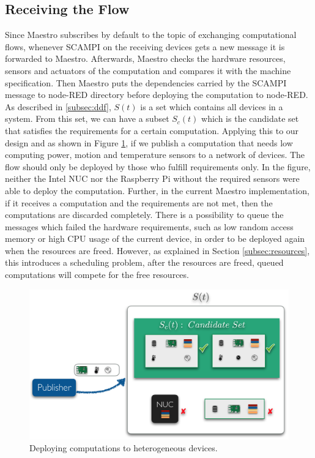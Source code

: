 \subsection{Receiving the Flow}
Since Maestro subscribes  by default  to the topic of exchanging computational flows, whenever SCAMPI on the receiving devices gets a new message it  is forwarded to Maestro. Afterwards, Maestro checks the hardware resources, sensors and actuators of the computation and compares it with the machine specification. Then Maestro puts the dependencies carried by the SCAMPI message to node-RED directory before deploying the computation to node-RED.  \\


\noindent As described in \ref{subsec:ddf}, $S(t)$ is a set which contains all devices in a system. From this set, we can have a subset $S_c(t)$ which is the candidate set that satisfies the requirements for a certain computation.  Applying this to our design and as shown in Figure \ref{fig:sets}, if we publish a computation that needs low computing  power, motion and temperature sensors to a network of devices. The flow should only be deployed by those who fulfill requirements only. In the figure, neither the Intel NUC nor the Raspberry Pi without the required sensors were able to deploy the computation. Further, in the current Maestro implementation, if it receives a computation and  the requirements  are not met, then the computations are discarded completely. There is a possibility to queue the  messages which failed the hardware requirements, such as low random access memory or high CPU usage of the current device, in order to be deployed again when the resources are freed.  However, as explained in Section \ref{subsec:resources}, this introduces a scheduling problem, after the resources are freed, queued computations will compete for the free resources.






\begin{figure}[H]
	\centering
	\includegraphics[scale=0.6]{images/sets.png}
	\caption{Deploying computations to heterogeneous devices.}
	\label{fig:sets}
\end{figure}



